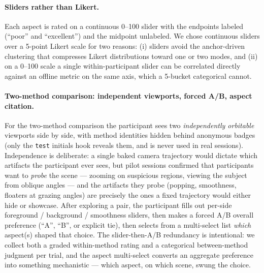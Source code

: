 \paragraph{Sliders rather than Likert.}
Each aspect is rated on a continuous 0--100 slider with the endpoints
labeled (``poor'' and ``excellent'') and the midpoint unlabeled. We
chose continuous sliders over a 5-point Likert scale for two reasons:
(i) sliders avoid the anchor-driven clustering that compresses Likert
distributions toward one or two modes, and (ii) on a 0--100 scale a
single within-participant slider can be correlated directly against an
offline metric on the same axis, which a 5-bucket categorical cannot.

\paragraph{Two-method comparison: independent viewports, forced A/B,
aspect citation.}
For the two-method comparison the participant sees two
\emph{independently orbitable} viewports side by side, with method
identities hidden behind anonymous badges (only the \texttt{test}
initials hook reveals them, and is never used in real sessions).
Independence is deliberate: a single baked camera trajectory would
dictate which artifacts the participant ever sees, but pilot sessions
confirmed that participants want to \emph{probe} the scene --- zooming
on suspicious regions, viewing the subject from oblique angles --- and
the artifacts they probe (popping, smoothness, floaters at grazing
angles) are precisely the ones a fixed trajectory would either hide or
showcase. After exploring a pair, the participant fills out per-side
foreground / background / smoothness sliders, then makes a forced A/B
overall preference (``A'', ``B'', or explicit tie), then selects from a
multi-select list \emph{which} aspect(s) shaped that choice. The
slider-then-A/B redundancy is intentional: we collect both a graded
within-method rating and a categorical between-method judgment per
trial, and the aspect multi-select converts an aggregate preference
into something mechanistic --- which aspect, on which scene, swung the
choice.


